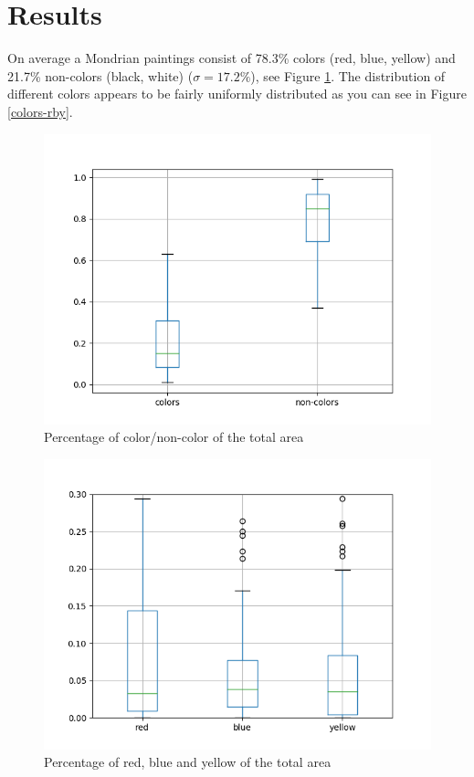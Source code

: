 \section{Results}


On average a Mondrian paintings consist of 78.3\% colors (red, blue, yellow) and
21.7\% non-colors (black, white) ($\sigma = 17.2\%$), see Figure
\ref{fig:colors-noncolors}. The distribution of different colors appears to be
fairly uniformly distributed as you can see in Figure \ref{colors-rby}.


\begin{figure}
  \includegraphics[width=\linewidth]{images/colors-non-colors.png}
  \caption{Percentage of color/non-color of the total area}
  \label{fig:colors-noncolors}
\end{figure}

\begin{figure}
  \includegraphics[width=\linewidth]{images/colors-rby.png}
  \caption{Percentage of red, blue and yellow of the total area}
  \label{fig:colors-rby}
\end{figure}

